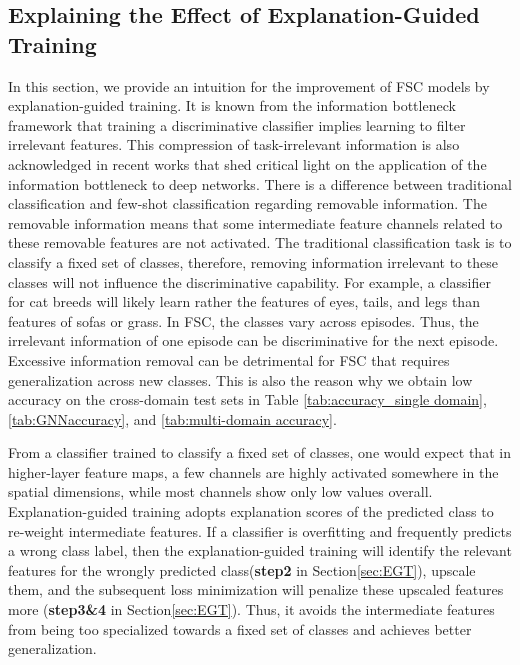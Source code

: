 \documentclass[a4paper,conference]{IEEEtran}
\begin{document}
\subsection{Explaining the Effect of Explanation-Guided Training}
\label{sec:feature_statistics}
In this section, we provide an intuition for the improvement of FSC models by explanation-guided training.
It is known from the information bottleneck framework that training a discriminative classifier implies learning to filter irrelevant features\cite{tishby2015deep}. This compression of task-irrelevant information is also acknowledged in recent works that shed critical light on the application of the information bottleneck to deep networks\cite{saxe2019information}. There is a difference between traditional classification and few-shot classification regarding removable information. The removable information means that some intermediate feature channels related to these removable features are not activated. The traditional classification task is to classify a fixed set of classes, therefore, removing information irrelevant to these classes will not influence the discriminative capability. For example, a classifier for cat breeds will likely learn rather the features of eyes, tails, and legs than features of sofas or grass. In FSC, the classes vary across episodes. Thus, the irrelevant information of one episode can be discriminative for the next episode. Excessive information removal can be detrimental for FSC that requires generalization across new classes. This is also the reason why we obtain low accuracy on the cross-domain test sets in Table \ref{tab:accuracy_single domain}, \ref{tab:GNNaccuracy}, and \ref{tab:multi-domain accuracy}.

From a classifier trained to classify a fixed set of classes, one would expect that in higher-layer feature maps, a few channels are highly activated somewhere in the spatial dimensions, while most channels show only low values overall. Explanation-guided training adopts explanation scores of the predicted class to re-weight intermediate features. If a classifier is overfitting and frequently predicts a wrong class label, then the explanation-guided training will identify the relevant features for the wrongly predicted class(\textbf{step2} in Section\ref{sec:EGT}), upscale them, and the subsequent loss minimization will penalize these upscaled features more (\textbf{step3\&4} in Section\ref{sec:EGT}). Thus, it avoids the intermediate features from being too specialized towards a fixed set of classes and achieves better generalization. 
\end{document}
